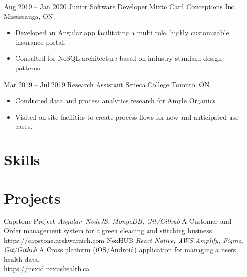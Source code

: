 \documentclass[letterpaper]{moderncv}
\begin{document}
\cventry
{Aug 2019 -- Jan 2020}
{Junior Software Developer}
{Mixto Card Conceptions Inc.}
{Mississauga, ON}
{}
{\begin{itemize}%
	\item Developed an Angular app facilitating a multi role, highly customizable insurance portal.
	\item Consulted for NoSQL architecture based on industry standard design patterns.
	\end{itemize}}
\cventry
{Mar 2019 -- Jul 2019}
{Research Assistant}
{Seneca College}
{Toronto, ON}
{}
{\begin{itemize}%
	\item Conducted data and process analytics research for Ample Organics.
	\item Visited on-site facilities to create process flows for new and anticipated use cases.
	\end{itemize}}
\section{Skills}
\section{Projects}
\cventry
{}
{Capstone Project}
{}
{\textit{Angular, NodeJS, MongoDB, Git/Github}}
{}
{A Customer and Order management system for a green cleaning and stitching business\\https://capstone.arshwaraich.com}
\vspace{1mm}
\cventry
{}
{NexHUB}
{}
{\textit{React Native, AWS Amplify, Figma, Git/Github}}
{}
{A Cross platform (iOS/Android) application for managing a user\textquotesingle{}s health data.\\https://nexid.nexushealth.ca}
\vspace{1mm}
\end{document}
